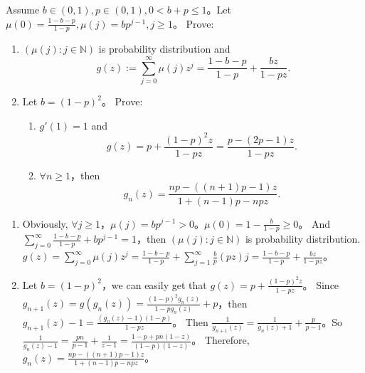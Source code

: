 \documentclass{ctexart}
\begin{document}
\begin{problem}\label{pro:2}
  Assume \(b \in (0,1), p \in (0,1),0 < b + p \leq 1\)\nolinebreak[4]。Let \(\mu(0)=\frac{1-b-p}{1-p},\mu(j)=bp^{j-1},j \geq 1\)\nolinebreak[4]。
  Prove:
  \begin{enumerate}
    \item   \((\mu(j):j \in \mathbb{N})\) is probability distribution and \[
        g(z):=\sum_{j=0}^{\infty} \mu(j)z^j=\frac{1-b-p}{1-p} + \frac{bz}{1-pz}.
      \]
    \item Let \(b =(1-p)^2\)\nolinebreak[4]。
      Prove:
      \begin{enumerate}
        \item   \(g'(1)=1\) and \[
            g(z)=p + \frac{(1-p)^2 z}{1-pz}=\frac{p-(2p-1)z}{1-pz}.
          \]
        \item \(\forall n \geq 1\)\nolinebreak[4]，then \[
            g_n(z)=\frac{np-((n + 1)p-1)z}{1 + (n-1)p-npz}.
          \]
      \end{enumerate}
  \end{enumerate}
\end{problem}
\begin{solution}
  \begin{enumerate}
    \item Obviously, \(\forall j \geq 1\)\nolinebreak[4]，\(\mu(j)=bp^{j-1}>0\)\nolinebreak[4]。\(\mu(0)=1-\frac{b}{1-p}\geq 0\)\nolinebreak[4]。
      And \(\sum_{j=0}^{\infty} \frac{1-b-p}{1-p}+bp^{j-1}=1\)\nolinebreak[4]，then \((\mu(j):j \in \mathbb{N})\) is probability distribution.
      \(g(z)=\sum_{j=0}^{\infty} \mu(j)z^j=\frac{1-b-p}{1-p} + \sum_{j=1}^{\infty} \frac{b}{p}(pz)j=\frac{1-b-p}{1-p} + \frac{bz}{1-pz}\)\nolinebreak[4]。
    \item Let \(b=(1-p)^2\)\nolinebreak[4]，we can easily get that \(g(z)=p + \frac{(1-p)^2z}{1-pz}\)\nolinebreak[4]。
      Since \(g_{n + 1}(z)=g(g_n(z))=\frac{(1-p)^2g_n(z)}{1-pg_n(z)} + p\)\nolinebreak[4]，then \(g_{n + 1}(z)-1=\frac{(g_n(z)-1)(1-p)}{1-pz}\)\nolinebreak[4]。
      Then \(\frac{1}{g_{n + 1}(z)}=\frac{1}{g_n(z) + 1}+ \frac{p}{p-1}\)\nolinebreak[4]。So \(\frac{1}{g_n(z)-1}=\frac{pn}{p-1} + \frac{1}{z-1}=\frac{1-p + pn(1-z)}{(1-p)(1-z)}\)\nolinebreak[4]。
      Therefore, \(g_n(z)=\frac{np-((n + 1)p-1)z}{1 + (n-1)p-npz}\)\nolinebreak[4]。
  \end{enumerate}
\end{solution}
\end{document}
